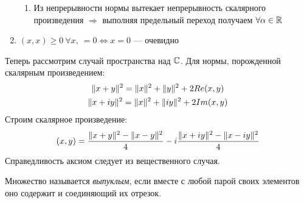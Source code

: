 \begin{proofocre}
\begin{enumerate}
\begin{enumerate}
        \item Из непрерывности нормы вытекает непрерывность скалярного произведения $\Rightarrow$ выполняя предельный переход получаем $\forall\alpha\in{\mathbb{R}}$
    \end{enumerate}
    \item $(x,x)\ge 0~\forall x,~=0 \Leftrightarrow x = 0$ --- очевидно
\end{enumerate}
Теперь рассмотрим случай пространства над ${\mathbb{C}}$.
Для нормы, порожденной скалярным произведением:
\begin{gather*}
    \|x + y\|^2 = \|x\|^2 + \|y\|^2 + 2Re(x, y)\\
    \|x + iy\|^2 = \|x\|^2 + \|iy\|^2 + 2Im(x,y)
\end{gather*}
Строим скалярное произведение:
$$(x, y) = \frac{\|x + y\|^2 - \|x - y\|^2}{4} - i\frac{\|x + iy\|^2 - \|x - iy\|^2}{4}$$
Справедливость аксиом следует из вещественного случая.
\end{proofocre}


\begin{definition}
Множество называется \emph{выпуклым}, если вместе с любой парой своих элементов оно содержит и соединяющий их отрезок.
\end{definition}

